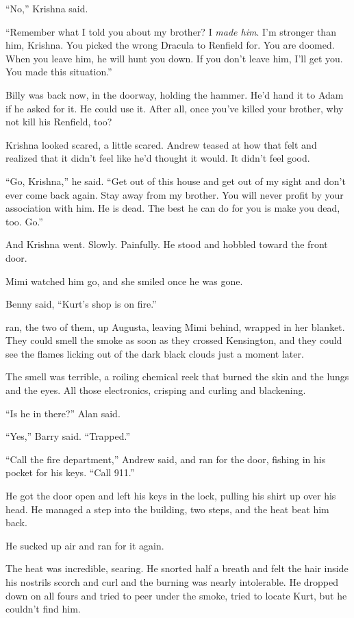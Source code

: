``No,'' Krishna said. 

``Remember what I told you about my brother?  I \textit{made him}. 
I'm stronger than him, Krishna.  You picked the wrong Dracula to
Renfield for.  You are doomed.  When you leave him, he will hunt you
down.  If you don't leave him, I'll get you.  You made this
situation.''

Billy was back now, in the doorway, holding the hammer.  He'd hand it
to Adam if he asked for it.  He could use it.  After all, once you've
killed your brother, why not kill his Renfield, too?

Krishna looked scared, a little scared.  Andrew teased at how that
felt and realized that it didn't feel like he'd thought it would.  It
didn't feel good. 

``Go, Krishna,'' he said.  ``Get out of this house and get out of my
sight and don't ever come back again.  Stay away from my brother.  You
will never profit by your association with him.  He is dead.  The best
he can do for you is make you dead, too.  Go.''

And Krishna went.  Slowly.  Painfully.  He stood and hobbled toward
the front door.

Mimi watched him go, and she smiled once he was gone.

Benny said, ``Kurt's shop is on fire.''

 ran, the two of them, up Augusta, leaving Mimi behind, wrapped in
her blanket.  They could smell the smoke as soon as they crossed
Kensington, and they could see the flames licking out of the dark
black clouds just a moment later.

The smell was terrible, a roiling chemical reek that burned the skin
and the lungs and the eyes.  All those electronics, crisping and
curling and blackening.

``Is he in there?'' Alan said. 

``Yes,'' Barry said.  ``Trapped.''

``Call the fire department,'' Andrew said, and ran for the door,
fishing in his pocket for his keys.  ``Call 911.''

He got the door open and left his keys in the lock, pulling his shirt
up over his head.  He managed a step into the building, two steps, and
the heat beat him back. 

He sucked up air and ran for it again. 

The heat was incredible, searing.  He snorted half a breath and felt
the hair inside his nostrils scorch and curl and the burning was
nearly intolerable.  He dropped down on all fours and tried to peer
under the smoke, tried to locate Kurt, but he couldn't find him.


